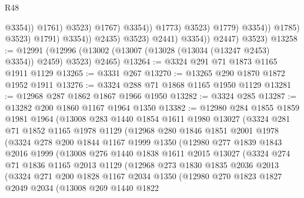 \begin{lexlean}{R48}
\begin{coremodule}
                                                    @3354))
                                                @1761)
                                              @3523)
                                            @1767)
                                          @3354))
                                      @1773)
                                    @3523)
                                  @1779)
                                @3354))
                            @1785)
                          @3523)
                        @1791)
                      @3354))
                  @2435)
                @3523)
              @2441)
            @3354))
        @2447)
      @3523)
@13258 := @12991 (@12996 (@13002 (@13007 (@13028 (@13034 (@13247 @2453) @3354)) @2459) @3523) @2465)
@13264 := @3324 @291 @71 @1873 @1165 @1911 @1129
@13265 := @3331 @267
@13270 := @13265 @290 @1870 @1872 @1952 @1911
@13276 := @3324 @288 @71 @1868 @1165 @1950 @1129
@13281 := @12968 @287 @1862 @1867 @1966 @1950
@13282 := @3324 @285
@13287 := @13282 @200 @1860 @1167 @1964 @1350
@13382 := @12980
    @284
    @1855
    @1859
    @1981
    @1964
    (@13008
      @283
      @1440
      @1854
      @1611
      @1980
      @13027
      (@3324
        @281
        @71
        @1852
        @1165
        @1978
        @1129
        (@12968
          @280
          @1846
          @1851
          @2001
          @1978
          (@3324
            @278
            @200
            @1844
            @1167
            @1999
            @1350
            (@12980
              @277
              @1839
              @1843
              @2016
              @1999
              (@13008
                @276
                @1440
                @1838
                @1611
                @2015
                @13027
                (@3324
                  @274
                  @71
                  @1836
                  @1165
                  @2013
                  @1129
                  (@12968
                    @273
                    @1830
                    @1835
                    @2036
                    @2013
                    (@3324
                      @271
                      @200
                      @1828
                      @1167
                      @2034
                      @1350
                      (@12980
                        @270
                        @1823
                        @1827
                        @2049
                        @2034
                        (@13008
                          @269
                          @1440
                          @1822

\end{coremodule}
\end{lexlean}
